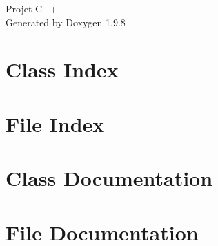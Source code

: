 \documentclass[twoside]{book}
\newcommand{\+}{\discretionary{\mbox{\scriptsize$\hookleftarrow$}}{}{}}
\newcommand{\clearemptydoublepage}{%
    \newpage{\pagestyle{empty}\cleardoublepage}%
  }
\begin{document}
  \raggedbottom
    \hypersetup{pageanchor=false,
                bookmarksnumbered=true,
                pdfencoding=unicode
               }
  \begin{titlepage}
  \vspace*{7cm}
  \begin{center}%
  {\Large Projet C++}\\
  \vspace*{1cm}
  {\large Generated by Doxygen 1.9.8}\\
  \end{center}
  \end{titlepage}
  \clearemptydoublepage
  \tableofcontents
  \clearemptydoublepage
  \hypersetup{pageanchor=true}

\chapter{Class Index}

\chapter{File Index}

\chapter{Class Documentation}





\chapter{File Documentation}





  \backmatter
  \newpage
  \clearemptydoublepage
  \printindex
\end{document}
